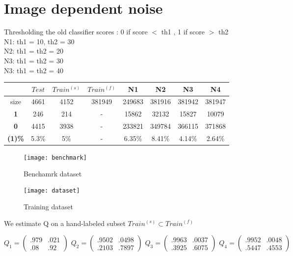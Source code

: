 \documentclass[10pt]{article}
\newcommand{\1}{\mathbbm{1}}
\newcommand{\0}{\mathbf{0}}
\begin{document}
\section{Image dependent noise}
Thresholding the old classifier scores : 0 if score $<$ th1 , 1 if score $>$ th2\\
N1:  th1 = 10, th2 = 30\\
N2:  th1 = th2 = 20\\
N3:  th1 = th2 = 30\\
N3:  th1 = th2 = 40\\
\begin{table}[H]
\centering
\begin{tabular}{|c|c|c|c|c|c|c|c|}
\hline
              &$Test$ &$Train^{(s)}$ & $Train^{(f)}$ & N1        & N2       & N3      &  N4\\
\hline
     size     & 4661   &4152         & 381949          & 249683  & 381916   & 381942  &  381947\\
\textbf{1}    & 246    &214          & -               & 15862   & 32132    & 15827   &  10079\\
\textbf{0}    & 4415   &3938         & -               & 233821  & 349784   & 366115  &  371868\\
\textbf{(1)\%}& 5.3\%  & 5\%         & -               & 6.35\%  & 8.41\%   & 4.14\%  &  2.64\%\\

\hline
\end{tabular}
\end{table}
\begin{figure}[H]
    \centering
    \texttt{[image: benchmark]}
    \caption{Benchamrk dataset}
\end{figure}
\begin{figure}[H]
    \centering
    \texttt{[image: dataset]}
    \caption{Training dataset}
\end{figure}
We estimate Q on a hand-labeled subset $Train^{(s)}\subset Train^{(f)}$
\begin{center}
$Q_1=\begin{pmatrix}.979&.021\\.08&.92\end{pmatrix}$
$Q_2=\begin{pmatrix}.9502&.0498\\.2103&.7897\end{pmatrix}$
$Q_3=\begin{pmatrix}.9963&.0037\\.3925&.6075\end{pmatrix}$
$Q_4=\begin{pmatrix}.9952&.0048\\.5447&.4553\end{pmatrix}$
\end{center}
\end{document}
